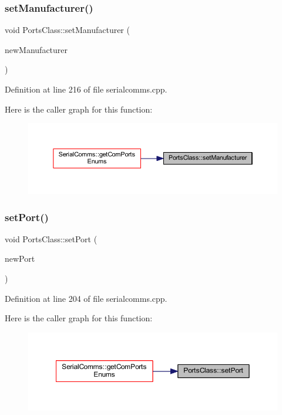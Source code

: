 \subsubsection{\texorpdfstring{setManufacturer()}{setManufacturer()}}
{\footnotesize\ttfamily void Ports\+Class\+::set\+Manufacturer (\begin{DoxyParamCaption}\item[{Q\+String}]{new\+Manufacturer }\end{DoxyParamCaption})}



Definition at line 216 of file serialcomms.\+cpp.

Here is the caller graph for this function\+:
\nopagebreak
\begin{figure}[H]
\begin{center}
\leavevmode
\includegraphics[width=350pt]{class_ports_class_a0ac6d29d8868c2ebde8811d0249d7e41_icgraph}
\end{center}
\end{figure}
\mbox{\label{class_ports_class_a0a7d3dc2ff387559e43d4bbb87aae0f7}} 
\subsubsection{\texorpdfstring{setPort()}{setPort()}}
{\footnotesize\ttfamily void Ports\+Class\+::set\+Port (\begin{DoxyParamCaption}\item[{Q\+String}]{new\+Port }\end{DoxyParamCaption})}



Definition at line 204 of file serialcomms.\+cpp.

Here is the caller graph for this function\+:
\nopagebreak
\begin{figure}[H]
\begin{center}
\leavevmode
\includegraphics[width=350pt]{class_ports_class_a0a7d3dc2ff387559e43d4bbb87aae0f7_icgraph}
\end{center}
\end{figure}
\mbox{\label{class_ports_class_a2bee64115fdaa041202522a909e66e00}} 
